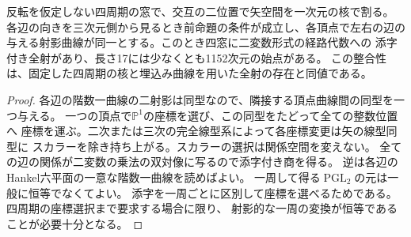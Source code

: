 \begin{corollary}\label{cor:four-window-binary-transfer}
反転を仮定しない四周期の窓で、交互の二位置で矢空間を一次元の核で割る。
各辺の向きを三次元側から見るとき前命題の条件が成立し、各頂点で左右の辺の
与える射影曲線が同一とする。このとき四窓に二変数形式の経路代数への
添字付き全射があり、長さ17には少なくとも1152次元の始点がある。
この整合性は、固定した四周期の核と埋込み曲線を用いた全射の存在と同値である。
\end{corollary}
\begin{proof}
各辺の階数一曲線の二射影は同型なので、隣接する頂点曲線間の同型を一つ与える。
一つの頂点で$\mathbb P^1$の座標を選び、この同型をたどって全ての整数位置へ
座標を運ぶ。二次または三次の完全線型系によって各座標変更は矢の線型同型に
スカラーを除き持ち上がる。スカラーの選択は関係空間を変えない。
全ての辺の関係が二変数の乗法の双対像に写るので添字付き商を得る。
逆は各辺のHankel六平面の一意な階数一曲線を読めばよい。
一周して得る$\operatorname{PGL}_2$の元は一般に恒等でなくてよい。
添字を一周ごとに区別して座標を選べるためである。四周期の座標選択まで要求する場合に限り、
射影的な一周の変換が恒等であることが必要十分となる。
\end{proof}
